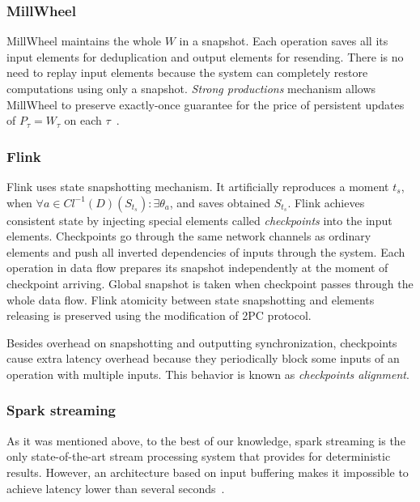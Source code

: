 \subsubsection{MillWheel}

MillWheel maintains the whole $W$ in a snapshot. Each operation saves all its input elements for deduplication and output elements for resending. There is no need to replay input elements because the system can completely restore computations using only a snapshot. {\em Strong productions} mechanism allows MillWheel to preserve exactly-once guarantee for the price of persistent updates of $P_\tau=W_\tau$ on each $\tau$~\cite{Akidau:2013:MFS:2536222.2536229}.    

\subsubsection{Flink}

Flink uses state snapshotting mechanism. It artificially reproduces a moment $t_s$, when $\forall{a}\in{Cl^{-1}(D)(S_{t_s})}:\exists{\theta_a}$, and saves obtained $S_{t_s}$. Flink achieves consistent state by injecting special elements called {\em checkpoints} into the input elements. Checkpoints go through the same network channels as ordinary elements and push all inverted dependencies of inputs through the system. Each operation in data flow prepares its snapshot independently at the moment of checkpoint arriving. Global snapshot is taken when checkpoint passes through the whole data flow. Flink atomicity between state snapshotting and elements releasing is preserved using the modification of 2PC protocol.

Besides overhead on snapshotting and outputting synchronization, checkpoints cause extra latency overhead because they periodically block some inputs of an operation with multiple inputs. This behavior is known as {\em checkpoints alignment}.

\subsubsection{Spark streaming}

As it was mentioned above, to the best of our knowledge, spark streaming is the only state-of-the-art stream processing system that provides for deterministic results. However, an architecture based on input buffering makes it impossible to achieve latency lower than several seconds~\cite{7530084, 7474816}. 


